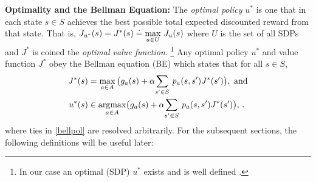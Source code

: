 \documentclass[12pt,draftcls,onecolumn]{IEEEtran}
\begin{document}
\textbf{Optimality and the Bellman Equation:} The \emph{optimal policy} $u^*$ is one that in each state $s\in S$ achieves the best possible total expected discounted reward from that state. That is, $J_{u^*}(s) = J^*(s) \doteq \underset{u\in U}{\max}~ J_u(s)$
where $U$ is the set of all SDPs and $J^*$ is coined the \emph{optimal value function}.
\footnote{In our case an optimal (SDP) $u^*$ exists and is well defined \cite{BertB}.}
Any optimal policy $u^*$ and value function $J^*$ obey the Bellman equation (BE) which states that for all $ s \in S$,
\begin{subequations}\label{bell}
\begin{align}
\label{bellval}J^*(s)&=\max_{ a\in A}\big(g_a(s)+\alpha \us{\sum}{s'\in S}p_a(s,s')J^*(s')\big),~\text{and}\\
\label{bellpol}u^*(s)&\in \underset{a\in A}{\argmax}\big(g_a(s)+\alpha \us{\sum}{s'\in S}p_a(s,s')J^*(s')\big),\,.
\end{align}
\end{subequations}
where ties in \eqref{bellpol} are resolved arbitrarily.
For the subsequent sections, the following definitions will be useful later:
\end{document}
